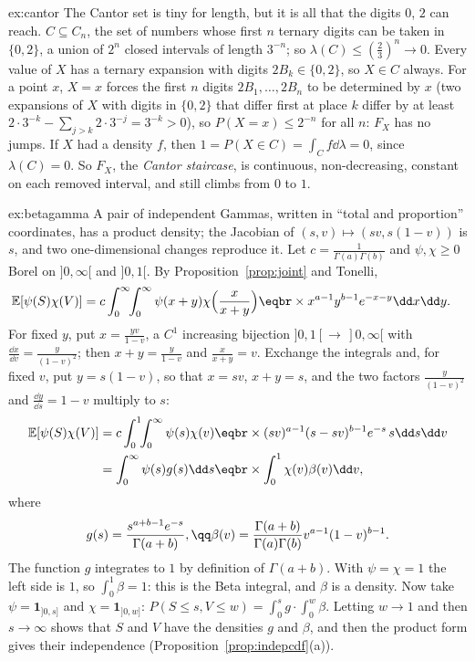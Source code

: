 \begin{solution}{ex:cantor}
\idea The Cantor set is tiny for length, but it is all that the digits $0$, $2$ can reach.
\writeup $C\subseteq C_n$, the set of numbers whose first $n$ ternary digits can be taken in $\{0,2\}$, a union of $2^n$ closed intervals of length
$3^{-n}$; so $\lambda(C)\le(\frac23)^n\to0$. Every value of $X$ has a ternary expansion with digits $2B_k\in\{0,2\}$, so $X\in C$ always. For a
point $x$, $X=x$ forces the first $n$ digits $2B_1,\dots,2B_n$ to be determined by $x$ (two expansions of $X$ with digits in $\{0,2\}$ that
differ first at place $k$ differ by at least $2\cdot3^{-k}-\sum_{j>k}2\cdot3^{-j}=3^{-k}>0$), so $P(X=x)\le2^{-n}$ for all $n$: $F_X$ has no jumps. If
$X$ had a density $f$, then $1=P(X\in C)=\int_Cf\dd\lambda=0$, since $\lambda(C)=0$. So $F_X$, the \emph{Cantor staircase}, is continuous,
non-decreasing, constant on each removed interval, and still climbs from $0$ to $1$.
\end{solution}

\begin{solution}{ex:betagamma}
\idea A pair of independent Gammas, written in ``total and proportion'' coordinates, has a product density; the
Jacobian of $(s,v)\mapsto(sv,s(1-v))$ is $s$, and two one-dimensional changes reproduce it.
\writeup Let $c=\frac1{\Gamma(a)\Gamma(b)}$ and $\psi,\chi\ge0$ Borel on $]0,\infty[$ and $]0,1[$. By Proposition~\ref{prop:joint} and Tonelli,
\[
\begin{aligned}\mathbb E[\psi(S)\chi(V)]&=c\int_0^\infty\!\!\int_0^\infty\psi(x+y)\chi\Bigl(\frac x{x+y}\Bigr)\eqbr\times x^{a-1}y^{b-1}e^{-x-y}\dd x\dd y.\end{aligned}
\]
For fixed $y$, put $x=\frac{yv}{1-v}$, a $C^1$ increasing bijection $]0,1[\to\,]0,\infty[$ with $\frac{\dd x}{\dd v}=\frac y{(1-v)^2}$; then $x+y=\frac y{1-v}$ and $\frac x{x+y}=v$. Exchange the
integrals and, for fixed $v$, put $y=s(1-v)$, so that $x=sv$, $x+y=s$, and the two factors $\frac y{(1-v)^2}$ and $\frac{\dd y}{\dd s}=1-v$ multiply to $s$:
\[
\begin{aligned}\mathbb E[\psi(S)\chi(V)]&=c\int_0^1\!\!\int_0^\infty\psi(s)\chi(v)\eqbr\times(sv)^{a-1}(s-sv)^{b-1}e^{-s}\,s\dd s\dd v\\
&=\int_0^\infty\psi(s)g(s)\dd s\eqbr\times\int_0^1\chi(v)\beta(v)\dd v,\end{aligned}
\]
where
\[
\begin{gathered}g(s)=\frac{s^{a+b-1}e^{-s}}{\Gamma(a+b)},\qq\beta(v)=\frac{\Gamma(a+b)}{\Gamma(a)\Gamma(b)}v^{a-1}(1-v)^{b-1}.\end{gathered}
\]
The function $g$ integrates to $1$ by definition of $\Gamma(a+b)$. With $\psi=\chi=1$ the left side
is $1$, so $\int_0^1\beta=1$: this is the Beta integral, and $\beta$ is a density. Now take $\psi=\mathbf 1_{]0,s]}$ and $\chi=\mathbf 1_{]0,w]}$:
$P(S\le s,V\le w)=\int_0^sg\cdot\int_0^w\beta$. Letting $w\to1$ and then $s\to\infty$ shows that $S$ and $V$ have the densities $g$ and $\beta$, and then
the product form gives their independence (Proposition~\ref{prop:indepcdf}(a)).
\end{solution}

